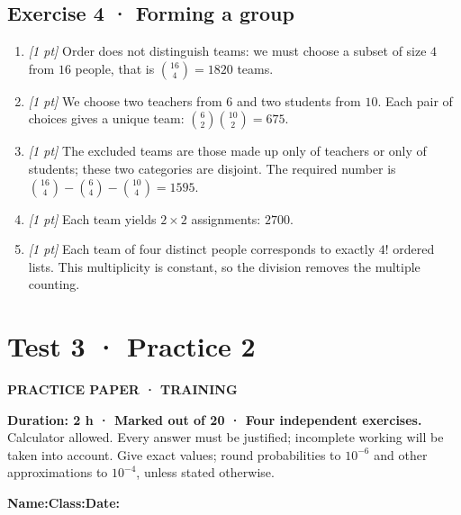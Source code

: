\subsection*{Exercise 4 · Forming a group}\begin{enumerate}

\item \textit{[1 pt]} Order does not distinguish teams: we must choose a subset of size $4$ from $16$ people, that is $\binom{16}4=1820$ teams.

\item \textit{[1 pt]} We choose two teachers from $6$ and two students from $10$. Each pair of choices gives a unique team: $\binom{6}2\binom{10}2=675$.

\item \textit{[1 pt]} The excluded teams are those made up only of teachers or only of students; these two categories are disjoint. The required number is $\binom{16}4-\binom{6}4-\binom{10}4=1595$.

\item \textit{[1 pt]} Each team yields $2\times2$ assignments: $2700$.

\item \textit{[1 pt]} Each team of four distinct people corresponds to exactly $4!$ ordered lists. This multiplicity is constant, so the division removes the multiple counting.

\end{enumerate}

\fi

\clearpage{}\label{sujet:4-2}

\section*{Test 3 · Practice 2}

{\sffamily\bfseries\color{teal}PRACTICE PAPER · TRAINING\par}

\textbf{Duration: 2 h · Marked out of 20 · Four independent exercises.}\\Calculator allowed. Every answer must be justified; incomplete working will be taken into account. Give exact values; round probabilities to $10^{-6}$ and other approximations to $10^{-4}$, unless stated otherwise.

\smallskip\textbf{Name:}\enspace\dotfill\quad\textbf{Class:}\enspace\dotfill\quad\textbf{Date:}\enspace\dotfill

